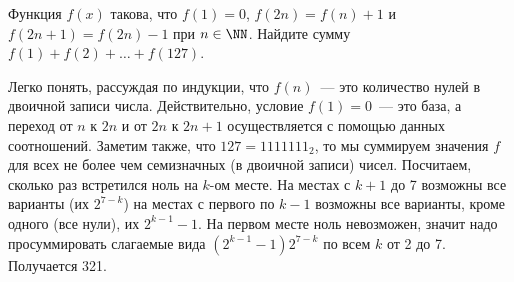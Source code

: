 \problem
Функция $f(x)$ такова, что
$f(1) = 0$, $f(2 n) = f(n) + 1$ и $f(2 n + 1) = f(2 n) - 1$ при $n \in \NN$.
Найдите сумму $f(1) + f(2) + \ldots + f(127)$.

\solution
Легко понять, рассуждая по индукции, что $f(n)$~--- это количество нулей в
двоичной записи числа.
Действительно, условие $f(1) = 0$~--- это база, а переход от $n$ к $2 n$ и
от $2 n$ к $2 n + 1$ осуществляется с помощью данных соотношений.
Заметим также, что $127 = 1111111_2$, то мы суммируем значения $f$ для всех
не более чем семизначных (в двоичной записи) чисел.
Посчитаем, сколько раз встретился ноль на $k$-ом месте.
На местах с $k + 1$ до 7 возможны все варианты (их $2^{7 - k}$) на местах с
первого по $k - 1$ возможны все варианты, кроме одного (все нули), их
$2^{k - 1} - 1$.
На первом месте ноль невозможен, значит надо просуммировать слагаемые вида
$(2^{k - 1} - 1) 2^{7 - k}$ по всем $k$ от 2 до 7.
Получается 321.

\endproblem
